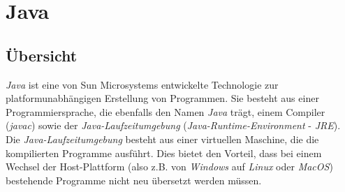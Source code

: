 \section{Java}
    \subsection{Übersicht}

        \emph{Java} ist eine von Sun Microsystems entwickelte Technologie zur platformunabhängigen 
        Erstellung von Programmen. Sie besteht aus einer Programmiersprache, die ebenfalls den Namen
        \emph{Java} trägt, einem Compiler (\emph{javac}) sowie der \emph{Java-Laufzeitumgebung} 
        (\emph{Java-Runtime-Environment} - \emph{JRE}).
        Die \emph{Java-Laufzeitumgebung} besteht aus einer virtuellen Maschine, die die kompilierten Programme ausführt.
        Dies bietet den Vorteil, dass bei einem Wechsel der Host-Plattform (also z.B. von \emph{Windows} auf \emph{Li\-nux}
        oder \emph{MacOS}) bestehende Programme nicht neu übersetzt werden müssen. \cite{Java_Insel}

